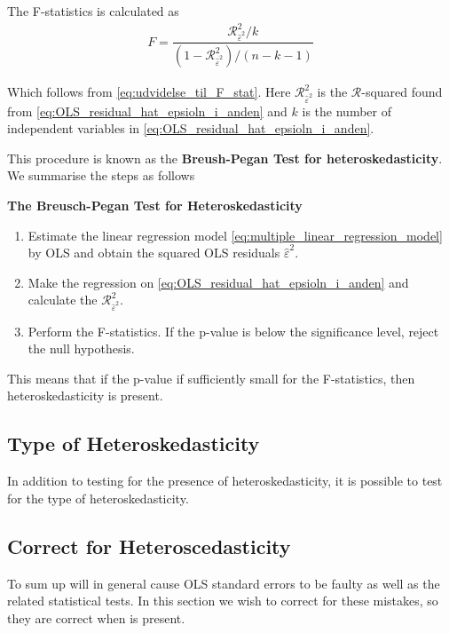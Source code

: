 The F-statistics is calculated as
\begin{align*}
    F = \dfrac{\mathcal{R}^2_{\hat{\varepsilon}^2}/k}{(1-\mathcal{R}^2_{\hat{\varepsilon}^2}) / (n-k-1)}
\end{align*}

Which follows from \eqref{eq:udvidelse_til_F_stat}. Here $\mathcal{R}^2_{\hat{\varepsilon}^2}$ is the $\mathcal{R}$-squared found from \eqref{eq:OLS_residual_hat_epsioln_i_anden} and $k$ is the number of independent variables in \eqref{eq:OLS_residual_hat_epsioln_i_anden}. 

This procedure is known as the \textbf{Breush-Pegan Test for heteroskedasticity}. We summarise the steps as follows

\textbf{The Breusch-Pegan Test for Heteroskedasticity}
\begin{enumerate}[label=(\roman*)]
    \item Estimate the linear regression model \eqref{eq:multiple_linear_regression_model} by OLS and obtain the squared OLS residuals $\hat{\varepsilon}^2$. 
    \item Make the regression on \eqref{eq:OLS_residual_hat_epsioln_i_anden} and calculate the $\mathcal{R}^2_{\hat{\varepsilon}^2}$. 
    \item Perform the F-statistics. If the p-value is below the significance level, reject the null hypothesis. 
\end{enumerate}

This means that if the p-value if sufficiently small for the F-statistics, then heteroskedasticity is present. 

\begin{example}

\end{example}

\subsection{Type of Heteroskedasticity}
In addition to testing for the presence of heteroskedasticity, it is possible to test for the type of heteroskedasticity. 



\subsection{Correct for Heteroscedasticity}
To sum up \hetero will in general cause OLS standard errors to be faulty as well as the related statistical tests. In this section we wish to correct for these mistakes, so they are correct when \hetero is present.




















